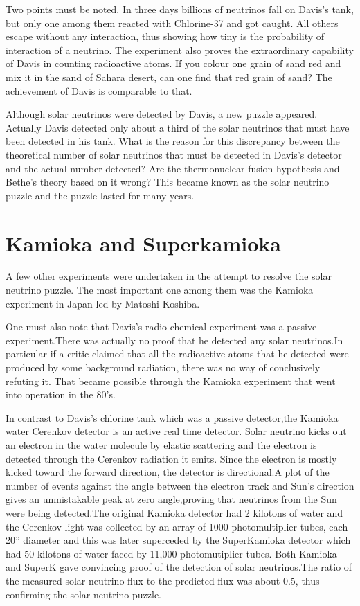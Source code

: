 Two points must be noted. In three days billions of neutrinos fall on
Davis’s tank, but only one among them reacted with Chlorine-37 and got
caught. All others escape without any interaction, thus showing how tiny
is the probability of interaction of a neutrino. The experiment also proves
the extraordinary capability of Davis in counting radioactive atoms. If you
colour one grain of sand red and mix it in the sand of Sahara desert, can one
find that red grain of sand? The achievement of Davis is comparable to that.

Although solar neutrinos were detected by Davis, a new puzzle appeared.
Actually Davis detected only about a third of the solar neutrinos that must
have been detected in his tank. What is the reason for this discrepancy
between the theoretical number of solar neutrinos that must be detected in Davis’s detector and the actual number detected? Are the thermonuclear
fusion hypothesis and Bethe’s theory based on it wrong? This became known
as the solar neutrino puzzle and the puzzle lasted for many years.

\section{Kamioka and Superkamioka}

A few other experiments were undertaken in the attempt to resolve the
solar neutrino puzzle. The most important one among them was the Kamioka
experiment in Japan led by Matoshi Koshiba.

One must also note that Davis’s radio chemical experiment was a passive
experiment.There was actually no proof that he detected any solar neutrinos.In particular if a critic claimed that all the radioactive atoms that he
detected were produced by some background radiation, there was no way of
conclusively refuting it. That became possible through the Kamioka experiment that went into operation in the 80’s.

In contrast to Davis’s chlorine tank which was a passive detector,the
Kamioka water Cerenkov detector is an active real time detector. Solar neutrino kicks out an electron in the water molecule by elastic scattering and
the electron is detected through the Cerenkov radiation it emits. Since the
electron is mostly kicked toward the forward direction, the detector is directional.A plot of the number of events against the angle between the electron
track and Sun’s direction gives an unmistakable peak at zero angle,proving
that neutrinos from the Sun were being detected.The original Kamioka detector had 2 kilotons of water and the Cerenkov light was collected by an
array of 1000 photomultiplier tubes, each 20” diameter and this was later
superceded by the SuperKamioka detector which had 50 kilotons of water
faced by 11,000 photomutiplier tubes. Both Kamioka and SuperK gave convincing proof of the detection of solar neutrinos.The ratio of the measured
solar neutrino flux to the predicted flux was about 0.5, thus confirming the
solar neutrino puzzle.

